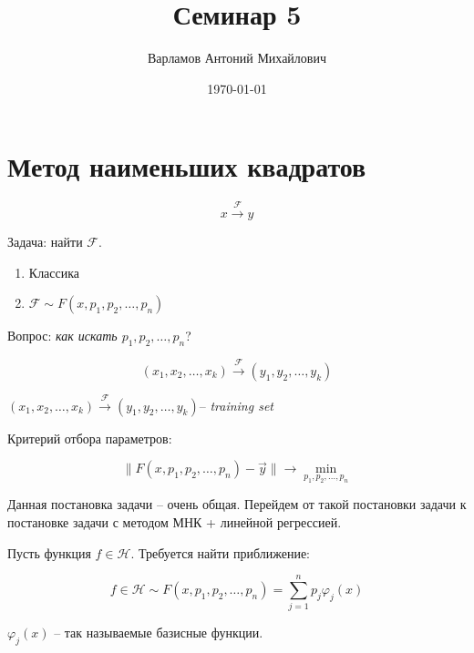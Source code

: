 \documentclass[10pt,a4paper]{article}
\title{Семинар 5}
\date{\today}
\author{Варламов Антоний Михайлович}
\begin{document}
	\maketitle

	\section{Метод наименьших квадратов}
	
	\begin{equation}
		x \xrightarrow{\mathcal{F}} y
 	\end{equation}
 	
 	Задача: найти $\mathcal{F}$.
 	
 	\begin{enumerate}
 		\item Классика
 		\item $\mathcal{F}\sim F\left(x, p_{1}, p_{2}, \ldots, p_{n}\right)$
 	\end{enumerate}
 	
 	Вопрос: \textit{как искать $p_{1}, p_{2}, \ldots, p_{n}$}?
 	
 	\begin{equation}
 		\left(x_{1}, x_{2}, \ldots, x_{k}\right) \xrightarrow{\mathcal{F}} 
 		\left(y_{1}, y_{2}, \ldots, y_{k}\right)
 	\end{equation}
 	
 	$\left(x_{1}, x_{2}, \ldots, x_{k}\right)\xrightarrow{\mathcal{F}} 
 		\left(y_{1}, y_{2}, \ldots, y_{k}\right)$-- \textit{training set}
 		
 	Критерий отбора параметров:
 	
 	\begin{equation}
 		\parallel F\left(x, p_{1}, p_{2}, \ldots, p_{n}\right) - \vec{y}
 		\parallel \rightarrow \min\limits_{p_{1}, p_{2}, \ldots, p_{n}}
 	\end{equation}
 	
 	Данная постановка задачи -- очень общая. Перейдем от такой постановки задачи 
 	к постановке задачи с методом МНК + линейной регрессией.
 	
	Пусть функция $f \in \mathcal{H}$. Требуется найти приближение:
 	
 	\begin{equation}
 		f\in \mathcal{H} \sim F\left(x, p_{1}, p_{2}, \ldots, p_{n}\right) = 
 		\sum\limits_{j = 1}^{n}p_{j}\varphi_{j}\left(x\right)
 	\end{equation}
 	
 	$\varphi_{j}\left(x\right)$ -- так называемые базисные функции.
 	
\end{document}

